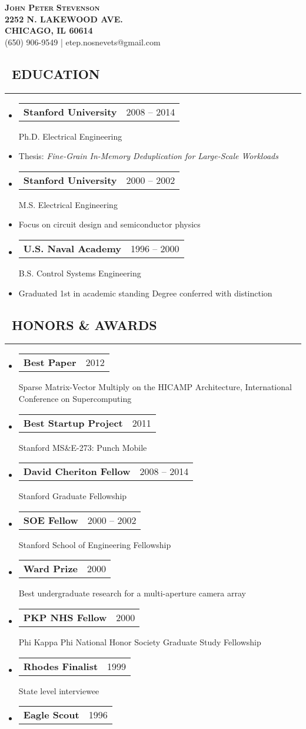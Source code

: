\documentclass[10pt,letterpaper]{article}
\makeatletter
\newenvironment{resumesection}[1]
{%
    \subsection*{\ \textcolor{light-gray}{#1} }
    \vspace{-0.4em}
    \begin{samepage}
    \hrule
    \end{samepage}
    \vspace{+0.4em}
    \begin{itemize}[leftmargin=0.15cm]
        \parskip=0.1em
}%
{%
    \end{itemize}
}%
\newcommand{\myitem}[1] {
    \item[] \textcolor{dark-gray}{#1}
}
\newcommand{\headertri}[3] {
    \item[] \begin{tabular*}{\linewidth}{l@{\extracolsep{\fill}}r}
    \textbf{#1} & #2 \\
    \end{tabular*}
    #3
}
\newcommand{\lminiw}{0.375}
\makeatother
\begin{document}
\begin{center}
{\huge{ \textsc{ { {\bfseries John Peter} {\bfseries Stevenson} }}}} \\
\vspace{0.5em}
\textcolor{light-gray}{
\footnotesize{\textbf{2252 N. LAKEWOOD AVE.}}  \\
\footnotesize{\textbf{CHICAGO, IL 60614    }}  \\
\footnotesize{{(650) 906-9549} | {etep.nosnevets@gmail.com}}
}
\end{center}

\begin{minipage}[t]{\lminiw\textwidth}
\begin{resumesection}{EDUCATION}
    \headertri
    {Stanford University}
    {2008 -- 2014}
    {Ph.D. Electrical Engineering}
    \myitem
    {Thesis: \textit{Fine-Grain In-Memory Deduplication for Large-Scale Workloads}}
    
    \headertri
    {Stanford University}
    {2000 -- 2002}
    {M.S. Electrical Engineering}
    \myitem
    {Focus on circuit design and semiconductor physics}
    
    \headertri
    {U.S. Naval Academy}
    {1996 -- 2000}
    {B.S. Control Systems Engineering}
    \myitem
    {Graduated 1st in academic standing \newline Degree conferred with distinction}
\end{resumesection}

\begin{resumesection}{HONORS \& AWARDS}
    \headertri
    {Best Paper}
    {2012}
    {Sparse Matrix-Vector Multiply on the {{HICAMP}} Architecture, International Conference on Supercomputing}
    
    \headertri
    {Best Startup Project}
    {2011}
    {Stanford MS\&E-273: Punch Mobile}
    
    \headertri
    {David Cheriton Fellow}
    {2008 -- 2014}
    {Stanford Graduate Fellowship}
    
    \headertri
    {SOE Fellow}
    {2000 -- 2002}
    {Stanford School of Engineering Fellowship}
    
    \headertri
    {Ward Prize}
    {2000}
    {Best undergraduate research for a multi-aperture camera array}
    
    \headertri
    {PKP NHS Fellow}
    {2000}
    {Phi Kappa Phi National Honor Society Graduate Study Fellowship}
    
    \headertri
    {Rhodes Finalist}
    {1999}
    {State level interviewee}
    
    \headertri
    {Eagle Scout}
    {1996}
    {}
\end{resumesection}

\end{minipage}
\end{document}
